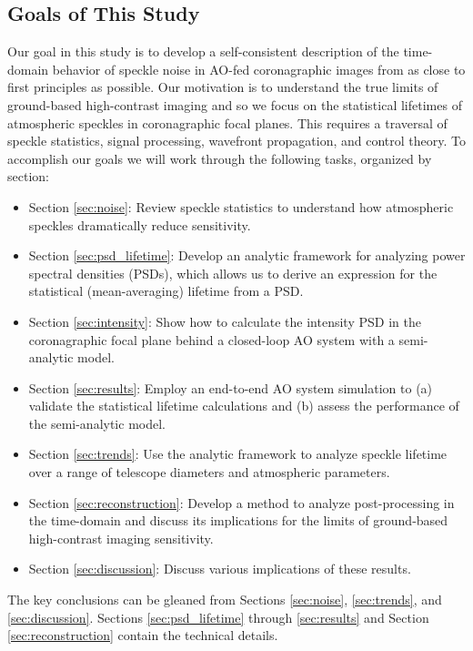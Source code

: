 \documentclass[10pt,preprint]{aastex631}
\begin{document}
\subsection{Goals of This Study}
Our goal in this study is to develop a self-consistent description of the time-domain behavior of speckle noise in AO-fed coronagraphic images from as close to first principles as possible.  Our motivation is to understand the true limits of ground-based high-contrast imaging and so we focus on the statistical lifetimes of atmospheric speckles in coronagraphic focal planes.   This requires a traversal of speckle statistics, signal processing, wavefront propagation, and control theory. To accomplish our goals we will work through the following tasks, organized by section:
\begin{itemize}
\item Section \ref{sec:noise}: Review speckle statistics to understand how atmospheric speckles dramatically reduce sensitivity.
\item Section \ref{sec:psd_lifetime}: Develop an analytic framework for analyzing power spectral densities (PSDs), which allows us to derive an expression for the statistical (mean-averaging) lifetime from a PSD.
\item Section \ref{sec:intensity}: Show how to calculate the intensity PSD in the coronagraphic focal plane behind a closed-loop AO system with a semi-analytic model.
\item Section \ref{sec:results}: Employ an end-to-end AO system simulation to (a) validate the statistical lifetime calculations and (b) assess the performance of the semi-analytic model.
\item Section \ref{sec:trends}: Use the analytic framework to analyze speckle lifetime over a range of telescope diameters and atmospheric parameters.
\item Section \ref{sec:reconstruction}: Develop a method to analyze post-processing in the time-domain and discuss its implications for the limits of ground-based high-contrast imaging sensitivity.
\item Section \ref{sec:discussion}: Discuss various implications of these results.
\end{itemize}
The key conclusions can be gleaned from Sections \ref{sec:noise}, \ref{sec:trends}, and \ref{sec:discussion}. Sections \ref{sec:psd_lifetime} through \ref{sec:results} and Section \ref{sec:reconstruction} contain the technical details.  
\end{document}
